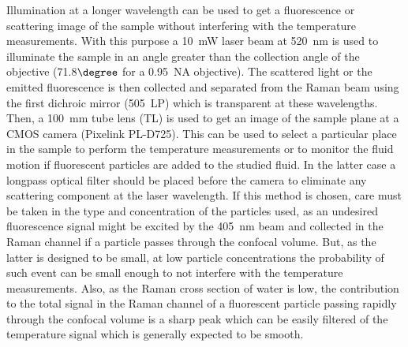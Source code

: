 \documentclass[9pt,twocolumn,twoside]{osajnl}
\begin{document}
\begin{figure}[htbp]
\end{figure}

Illumination at a longer wavelength can be used to get a fluorescence or scattering image of the sample without interfering with the temperature measurements. With this purpose a 10~mW laser beam at 520~nm is used to illuminate the sample in an angle greater than the collection angle of the objective (71.8$\degree$ for a 0.95~NA objective). The scattered light or the emitted fluorescence is then collected and separated from the Raman beam using the first dichroic mirror (505~LP) which is transparent at these wavelengths. Then, a 100~mm tube lens (TL) is used to get an image of the sample plane at a CMOS camera (Pixelink PL-D725). This can be used to select a particular place in the sample to perform the temperature measurements or to monitor the fluid motion if fluorescent particles are added to the studied fluid. In the latter case a longpass optical filter should be placed before the camera to eliminate any scattering component at the laser wavelength. If this method is chosen, care must be taken in the type and concentration of the particles used, as an undesired fluorescence signal might be excited by the 405~nm beam and collected in the Raman channel if a particle passes through the confocal volume. But, as the latter is designed to be small, at low particle concentrations the probability of such event can be small enough to not interfere with the temperature measurements. Also, as the Raman cross section of water is low, the contribution to the total signal in the Raman channel of a fluorescent particle passing rapidly through the confocal volume is a sharp peak which can be easily filtered of the temperature signal which is generally expected to be smooth. 
 
\end{document}
